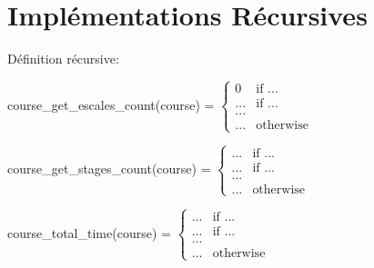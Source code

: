 \section{Implémentations Récursives}\label{recursivite}

Définition récursive:


course\_get\_escales\_count(course) = $
                \begin{cases}
                    0 & \text{if } ... \\
                    ... & \text{if } ... \\
                            ...          \\
                    ... & \text{otherwise}
                \end{cases} $


course\_get\_stages\_count(course) = $
                \begin{cases}
                    ... & \text{if } ... \\
                    ... & \text{if } ... \\
                            ...          \\
                    ... & \text{otherwise}
                \end{cases} $

course\_total\_time(course) = $
                \begin{cases}
                    ... & \text{if } ... \\
                    ... & \text{if } ... \\
                            ...          \\
                    ... & \text{otherwise}
                \end{cases} $

